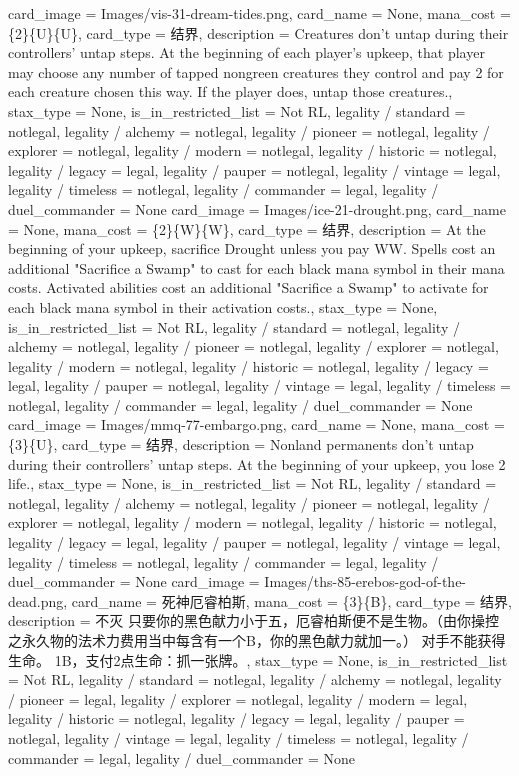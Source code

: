 \documentclass[lang = cn, color = black, 10pt]{AllThatStax}
\begin{document}
\card
{
	card_image = Images/vis-31-dream-tides.png,
	card_name = None,
	mana_cost = \{2\}\{U\}\{U\},
	card_type = 结界,
	description = Creatures don't untap during their controllers' untap steps.
	At the beginning of each player's upkeep, that player may choose any number of tapped nongreen creatures they control and pay {2} for each creature chosen this way. If the player does, untap those creatures.,
	stax_type = None,
	is_in_restricted_list = Not RL,
	legality / standard = notlegal,
	legality / alchemy = notlegal,
	legality / pioneer = notlegal,
	legality / explorer = notlegal,
	legality / modern = notlegal,
	legality / historic = notlegal,
	legality / legacy = legal,
	legality / pauper = notlegal,
	legality / vintage = legal,
	legality / timeless = notlegal,
	legality / commander = legal,
	legality / duel_commander = None
}
\card
{
	card_image = Images/ice-21-drought.png,
	card_name = None,
	mana_cost = \{2\}\{W\}\{W\},
	card_type = 结界,
	description = At the beginning of your upkeep, sacrifice Drought unless you pay {W}{W}.
	Spells cost an additional "Sacrifice a Swamp" to cast for each black mana symbol in their mana costs.
	Activated abilities cost an additional "Sacrifice a Swamp" to activate for each black mana symbol in their activation costs.,
	stax_type = None,
	is_in_restricted_list = Not RL,
	legality / standard = notlegal,
	legality / alchemy = notlegal,
	legality / pioneer = notlegal,
	legality / explorer = notlegal,
	legality / modern = notlegal,
	legality / historic = notlegal,
	legality / legacy = legal,
	legality / pauper = notlegal,
	legality / vintage = legal,
	legality / timeless = notlegal,
	legality / commander = legal,
	legality / duel_commander = None
}
\card
{
	card_image = Images/mmq-77-embargo.png,
	card_name = None,
	mana_cost = \{3\}\{U\},
	card_type = 结界,
	description = Nonland permanents don't untap during their controllers' untap steps.
	At the beginning of your upkeep, you lose 2 life.,
	stax_type = None,
	is_in_restricted_list = Not RL,
	legality / standard = notlegal,
	legality / alchemy = notlegal,
	legality / pioneer = notlegal,
	legality / explorer = notlegal,
	legality / modern = notlegal,
	legality / historic = notlegal,
	legality / legacy = legal,
	legality / pauper = notlegal,
	legality / vintage = legal,
	legality / timeless = notlegal,
	legality / commander = legal,
	legality / duel_commander = None
}
\card
{
	card_image = Images/ths-85-erebos-god-of-the-dead.png,
	card_name = 死神厄睿柏斯,
	mana_cost = \{3\}\{B\},
	card_type = 结界,
	description = 不灭
	只要你的黑色献力小于五，厄睿柏斯便不是生物。（由你操控之永久物的法术力费用当中每含有一个{B}，你的黑色献力就加一。）
	对手不能获得生命。
	{1}{B}，支付2点生命：抓一张牌。,
	stax_type = None,
	is_in_restricted_list = Not RL,
	legality / standard = notlegal,
	legality / alchemy = notlegal,
	legality / pioneer = legal,
	legality / explorer = notlegal,
	legality / modern = legal,
	legality / historic = notlegal,
	legality / legacy = legal,
	legality / pauper = notlegal,
	legality / vintage = legal,
	legality / timeless = notlegal,
	legality / commander = legal,
	legality / duel_commander = None
}
\end{document}
